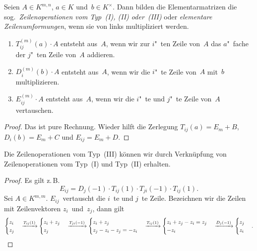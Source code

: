 \documentclass[a4paper]{article}
\begin{document}
\begin{lemma}[Zeilenoperationen]
    Seien $A \in K^{m,n}$, $a \in K$ und~$b \in K^\times$. Dann bilden die Elementarmatrizen die sog.\ \emph{Zeilenoperationen vom Typ~(I), (II) oder~(III)} oder \emph{elementare Zeilenumformungen}, wenn sie von links multipliziert werden.
    \begin{enumerate}
        \item $T_{ij}^{(m)}(a) \cdot A$ entsteht aus~$A$, wenn wir zur $i$"~ten Zeile von~$A$ das $a$"~fache der $j$"~ten Zeile von~$A$ addieren.
        \item $D_i^{(m)}(b) \cdot A$ entsteht aus~$A$, wenn wir die $i$"~te Zeile von~$A$ mit~$b$ multiplizieren.
        \item $E_{ij}^{(m)} \cdot A$ entsteht aus~$A$, wenn wir die $i$"~te und $j$"~te Zeile von~$A$ vertauschen.
    \end{enumerate}
\end{lemma}

\begin{proof}
    Das ist pure Rechnung. Wieder hilft die Zerlegung $T_{ij}(a) = E_m + B$, $D_i(b) = E_m + C$ und $E_{ij} = E_m + D$.
\end{proof}

\begin{lemma}\label{lem:elementary:type3}
    Die Zeilenoperationen vom Typ~(III) können wir durch Verknüpfung von Zeilenoperationen vom Typ~(I) und Typ~(II) erhalten.
\end{lemma}

\begin{proof}
    Es gilt z.\,B.\
    \begin{equation*}
        E_{ij} = D_j(-1) \cdot T_{ij}(1) \cdot T_{ji}(-1) \cdot T_{ij}(1).
    \end{equation*}
    Sei $A \in K^{m,m}$. $E_{ij}$~vertauscht die $i$~te und $j$~te Zeile. Bezeichnen wir die Zeilen mit Zeilenvektoren $z_i$~und~$z_j$, dann gilt
    \begin{equation*}
        \begin{cases}
            z_i \\ z_j
        \end{cases}
        \xrightarrow{T_{ij}(1)}
        \begin{cases}
            z_i+z_j \\ z_j
        \end{cases}
        \xrightarrow{T_{ji}(-1)}
        \begin{cases}
            z_i+z_j \\ z_j-z_i-z_j = -z_i
        \end{cases}
        \xrightarrow{T_{ij}(1)}
        \begin{cases}
            z_i+z_j-z_i = z_j \\ -z_i
        \end{cases}
        \xrightarrow{D_j(-1)}
        \begin{cases}
            z_j \\ z_i
        \end{cases}. \qedhere
    \end{equation*}
\end{proof}
\end{document}
